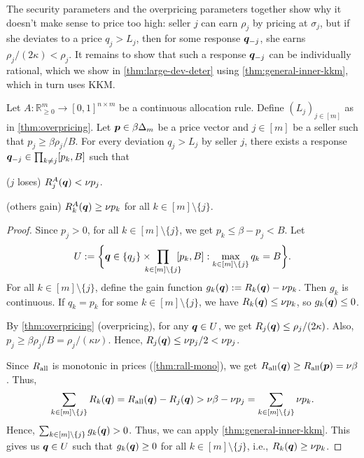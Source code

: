 The security parameters and the overpricing parameters together show
why it doesn't make sense to price too high:
seller $j$ can earn $\rho_j$ by pricing at $\sigma_j$,
but if she deviates to a price $q_j > L_j$,
then for some response $\bm{q}_{-j}$, she earns $\rho_j/(2\kappa) < \rho_j$.
It remains to show that such a response $\bm{q}_{-j}$ can be individually rational,
which we show in \cref{thm:large-dev-deter} using \cref{thm:general-inner-kkm},
which in turn uses KKM.

\begin{lemma}
\label{thm:large-dev-deter}
Let $A: \mathbb{R}_{\ge 0}^m \to [0, 1]^{n \times m}$ be a continuous allocation rule.
Define $(L_j)_{j \in [m]}$ as in \cref{thm:overpricing}.
%
Let $\bm{p} \in \beta\Delta_m$ be a price vector and $j \in [m]$ be a seller such that $p_j \ge \beta\rho_j/B$.
For every deviation $q_j > L_j$ by seller $j$, there exists a response
$\bm{q}_{-j} \in \prod_{k \neq j} [p_k, B]$ such that
\begin{tightenum}
\item ($j$ loses) $R^A_j(\bm{q}) < \nu p_j$.
\item (others gain) $R^A_k(\bm{q}) \ge \nu p_k$ for all $k \in [m] \setminus \{j\}$.
\end{tightenum}
\end{lemma}
\begin{proof}
Since $p_j > 0$, for all $k \in [m] \setminus \{j\}$, we get $p_k \le \beta - p_j < B$. Let
\[ U \defeq \bigg\{\qvec \in \{q_j\} \times \!\!\!\!\! \prod_{k \in [m] \setminus \{j\}} \!\!\! [p_k, B]:
    \max_{k \in [m] \setminus \{j\}} q_k = B\bigg\}. \]
For all $k \in [m] \setminus \{j\}$, define the gain function $g_k(\bm{q}) := R_k(\bm{q}) - \nu p_k$.
Then $g_k$ is continuous.
If $q_k = p_k$ for some $k \in [m] \setminus \{j\}$, we have $R_k(\bm{q}) \le \nu p_k$, so $g_k(\bm{q}) \le 0$.

By \cref{thm:overpricing} (overpricing), for any $\bm{q} \in U$,
we get $R_j(\bm{q}) \le \rho_j/(2\kappa)$.
Also, $p_j \ge \beta\rho_j/B = \rho_j/(\kappa\nu)$.
Hence, $R_j(\bm{q}) \le \nu p_j / 2 < \nu p_j$.

Since $R_{\operatorname{all}}$ is monotonic in prices (\cref{thm:rall-mono}),
we get $R_{\operatorname{all}}(\bm{q}) \ge R_{\operatorname{all}}(\bm{p}) = \nu\beta$. Thus,
\[ \sum_{k \in [m] \setminus \{j\}} R_k(\bm{q}) = R_{\operatorname{all}}(\bm{q}) - R_j(\bm{q})
    > \nu\beta - \nu p_j = \sum_{k \in [m] \setminus \{j\}} \nu p_k. \]
Hence, $\sum_{k \in [m] \setminus \{j\}} g_k(\bm{q}) > 0$.
%
Thus, we can apply \cref{thm:general-inner-kkm}.
This gives us $\bm{q} \in U$ such that $g_k(\bm{q}) \ge 0$ for all $k \in [m] \setminus \{j\}$,
i.e., $R_k(\bm{q}) \ge \nu p_k$.
\end{proof}


